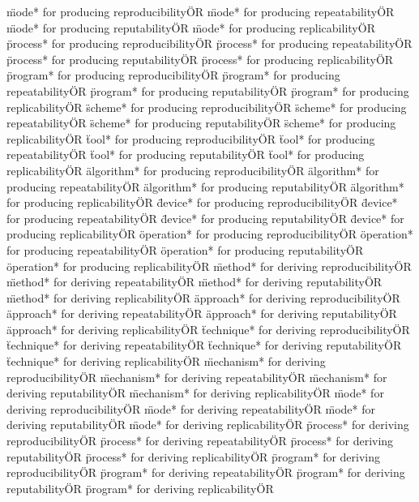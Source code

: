 \documentclass[
10pt, %
a4paper, %
oneside, %
headinclude,footinclude, %
BCOR5mm, %
]{scrartcl}
\begin{document}
\"mode* for producing reproducibility\" OR \"mode* for producing repeatability\" OR \"mode* for producing reputability\" OR \"mode* for producing replicability\" OR 
\"process* for producing reproducibility\" OR \"process* for producing repeatability\" OR \"process* for producing reputability\" OR \"process* for producing replicability\" OR 
\"program* for producing reproducibility\" OR \"program* for producing repeatability\" OR \"program* for producing reputability\" OR \"program* for producing replicability\" OR 
\"scheme* for producing reproducibility\" OR \"scheme* for producing repeatability\" OR \"scheme* for producing reputability\" OR \"scheme* for producing replicability\" OR 
\"tool* for producing reproducibility\" OR \"tool* for producing repeatability\" OR \"tool* for producing reputability\" OR \"tool* for producing replicability\" OR 
\"algorithm* for producing reproducibility\" OR \"algorithm* for producing repeatability\" OR \"algorithm* for producing reputability\" OR \"algorithm* for producing replicability\" OR 
\"device* for producing reproducibility\" OR \"device* for producing repeatability\" OR \"device* for producing reputability\" OR \"device* for producing replicability\" OR 
\"operation* for producing reproducibility\" OR \"operation* for producing repeatability\" OR \"operation* for producing reputability\" OR \"operation* for producing replicability\" OR 
\"method* for deriving reproducibility\" OR \"method* for deriving repeatability\" OR \"method* for deriving reputability\" OR \"method* for deriving replicability\" OR 
\"approach* for deriving reproducibility\" OR \"approach* for deriving repeatability\" OR \"approach* for deriving reputability\" OR \"approach* for deriving replicability\" OR 
\"technique* for deriving reproducibility\" OR \"technique* for deriving repeatability\" OR \"technique* for deriving reputability\" OR \"technique* for deriving replicability\" OR 
\"mechanism* for deriving reproducibility\" OR \"mechanism* for deriving repeatability\" OR \"mechanism* for deriving reputability\" OR \"mechanism* for deriving replicability\" OR 
\"mode* for deriving reproducibility\" OR \"mode* for deriving repeatability\" OR \"mode* for deriving reputability\" OR \"mode* for deriving replicability\" OR 
\"process* for deriving reproducibility\" OR \"process* for deriving repeatability\" OR \"process* for deriving reputability\" OR \"process* for deriving replicability\" OR 
\"program* for deriving reproducibility\" OR \"program* for deriving repeatability\" OR \"program* for deriving reputability\" OR \"program* for deriving replicability\" OR 
\end{document}
